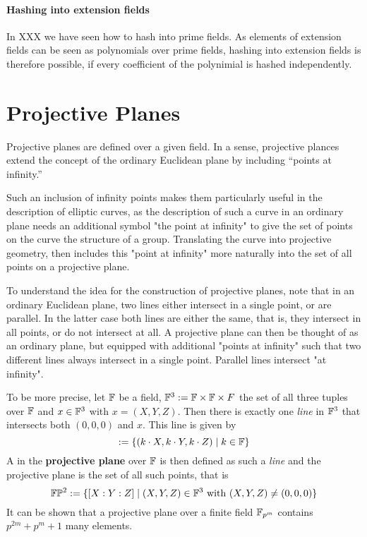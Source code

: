 \paragraph{Hashing into extension fields} In XXX we have seen how to hash into prime fields. As elements of extension fields can be seen as polynomials over prime fields, hashing into extension fields is therefore possible, if every coefficient of the polynimial is hashed independently. 
\section{Projective Planes}\label{sec:planes}
Projective planes are  defined over a given field. In a sense, projective plances extend the concept of the ordinary Euclidean plane by including ``points at infinity.''

Such an inclusion of infinity points makes them particularly useful in the description of elliptic curves, as the description of such a curve in an ordinary plane needs an additional symbol "the point at infinity" to give the set of points on the curve the structure of a group. Translating the curve into projective geometry, then includes this "point at infinity" more naturally into the set of all points on a projective plane.

To understand the idea for the construction of projective planes, note that in
an ordinary Euclidean plane, two lines either intersect in a single point, or are parallel. In the latter case both lines are either the same, that is, they intersect in all points, or do not intersect at all. A projective plane can then be thought of as an ordinary plane, but equipped with additional "points at infinity" such that two different lines always intersect in a single point. Parallel lines intersect "at infinity".

To be more precise, let $\mathbb{F}$ be a field, $\mathbb{F}^3:=\mathbb{F}\times \mathbb{F}\times F$ the set of all three tuples over $\mathbb{F}$ and $x\in \mathbb{F}^3$ with $x=(X,Y,Z)$. Then there is exactly one \textit{line} in $\mathbb{F}^3$ that intersects both $(0,0,0)$ and $x$. This line is given by
\begin{equation}
[X:Y:Z] := \{(k\cdot X,k\cdot Y, k\cdot Z)\;|\; k\in\F\}
\end{equation}
A  in the \textbf{projective plane} over $\mathbb{F}$ is then defined as such a \textit{line} and the projective plane is the set of all such points, that is
\begin{equation}
\mathbb{F}\mathbb{P}^2:=\{[X:Y:Z]\;|\; (X,Y,Z)\in \mathbb{F}^3\text{ with } (X,Y,Z)\neq (0,0,0)\}
\end{equation}
It can be shown that a projective plane over a finite field $\mathbb{F}_{p^m}$ contains $p^{2m}+p^m+1$ many elements.

